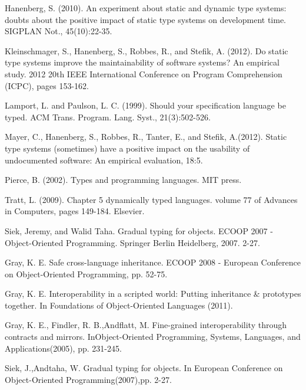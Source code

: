 \documentclass[msc]{ppgccufmg}
\begin{document}
\begin{thebibliography}{}
Hanenberg, S. (2010). An experiment about static and dynamic type systems: doubts about the positive impact of static type systems on development time. SIGPLAN Not., 45(10):22-35.

Kleinschmager, S., Hanenberg, S., Robbes, R., and Stefik, A. (2012). Do static type systems improve the maintainability of software systems? An empirical study. 2012 20th IEEE International Conference on Program Comprehension (ICPC), pages 153-162.

Lamport, L. and Paulson, L. C. (1999). Should your specification language be typed. ACM Trans. Program. Lang. Syst., 21(3):502-526.

Mayer, C., Hanenberg, S., Robbes, R., Tanter, E., and Stefik, A.(2012). Static type systems (sometimes) have a positive impact on the usability of undocumented software: An empirical evaluation,  18:5.

Pierce, B. (2002). Types and programming languages. MIT press.

Tratt, L. (2009). Chapter 5 dynamically typed languages. volume 77 of Advances in Computers, pages 149-184. Elsevier.

Siek, Jeremy, and Walid Taha. Gradual typing for objects. ECOOP 2007 - Object-Oriented Programming. Springer Berlin Heidelberg, 2007. 2-27.

Gray, K. E. Safe cross-language inheritance. ECOOP 2008 - European Conference on Object-Oriented Programming, pp. 52-75.

Gray, K. E. Interoperability in a scripted world: Putting inheritance \& prototypes together. In Foundations of Object-Oriented Languages (2011).

Gray, K. E., Findler, R. B.,Andflatt, M. Fine-grained interoperability through contracts and mirrors. InObject-Oriented Programming, Systems, Languages, and Applications(2005), pp. 231-245.

Siek, J.,Andtaha, W. Gradual typing for objects. In European Conference on Object-Oriented Programming(2007),pp. 2-27.


\end{thebibliography}
\end{document}
